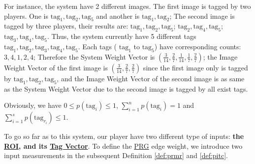 For instance, the system have 2 different images. The first image is tagged by two players. One is 
$\text{tag}_1, \text{tag}_2, \text{tag}_5$ and another is $\text{tag}_1, \text{tag}_2$;
The second image is tagged by three players, their results are:
$\text{tag}_1, \text{tag}_2, \text{tag}_5$;
$\text{tag}_2, \text{tag}_4, \text{tag}_5$; 
$\text{tag}_3, \text{tag}_4, \text{tag}_5$. 
Thus, the system currently have 5 different tags $\text{tag}_1, \text{tag}_2, \text{tag}_3, \text{tag}_4, \text{tag}_5$.
Each tags ( $\text{tag}_1$ to $\text{tag}_5$) have corresponding counts: $3, 4, 1, 2, 4$; Therefore the
System Weight Vector is $(\frac{3}{14}, \frac{2}{7}, \frac{1}{14}, \frac{1}{7}, \frac{2}{7})$;
the Image Weight Vector of the first image is $(\frac{3}{14}, \frac{2}{7}, \frac{2}{7})$
since the first image only is tagged by $\text{tag}_1, \text{tag}_2, \text{tag}_5$, and
the Image Weight Vector of the second image is as same as the System Weight Vector
due to the second image is tagged by all exist tags.

Obviously, we have $0 \leq p(\text{tag}_i)\leq 1$, $\sum_{i=1}^{n}{p(\text{tag}_{i})}=1$ and $\sum_{i=1}^{s}{p(\text{tag}_{r_i})} \leq 1$.

To go so far as to this system, our player have two different type of inputs: \textbf{the \hyperref[def:roi]{ROI}, 
and its \hyperref[def:tagv]{Tag Vector}}. To define the \hyperref[idx:prg]{PRG} edge weight, 
we introduce two input measurements in the subsequent Definition \ref{def:prmr} and \ref{def:pitc}.


